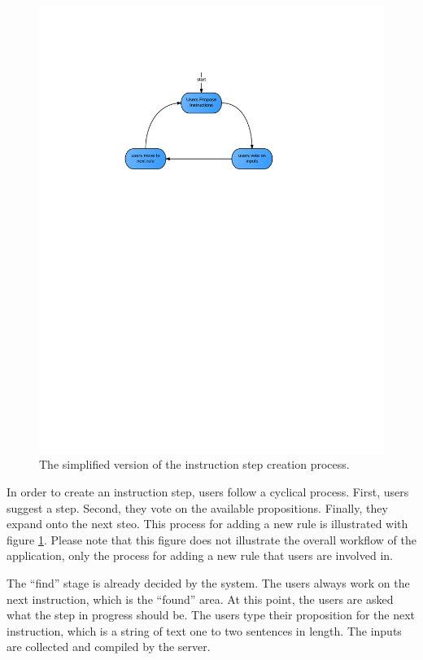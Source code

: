 \begin{figure}
	\begin{center}
	\includegraphics{figures/cmWorkflow1.png}
	\caption{The simplified version of the instruction step creation process.}
	\label{fig:cmWorkflow1}
	\end{center}
\end{figure}

In order to create an instruction step, users follow a cyclical process.
First, users suggest a step. 
Second, they vote on the available propositions.
Finally, they expand onto the next steo.
 This process for adding a new rule is illustrated with figure \ref{fig:cmWorkflow1}. 
Please note that this figure does not illustrate the overall workflow of the application, only the process for adding a new rule that users are involved in.

The ``find'' stage is already decided by the system. The users always work on the next instruction, which is the ``found'' area. 
At this point, the users are asked what the step in progress should be. 
The users type their proposition for the next instruction, which is a string of text one to two sentences in length.
The inputs are collected and compiled by the server.

